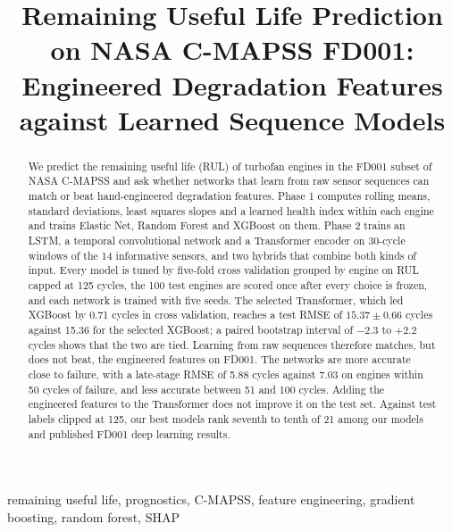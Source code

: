 \documentclass[conference]{IEEEtran}
\begin{document}
\title{Remaining Useful Life Prediction on NASA C-MAPSS FD001: Engineered Degradation Features against Learned Sequence Models}

\author{
}

\maketitle

\begin{abstract}
We predict the remaining useful life (RUL) of turbofan engines in the FD001
subset of NASA C-MAPSS and ask whether networks that learn from raw sensor
sequences can match or beat hand-engineered degradation features. Phase 1
computes rolling means, standard deviations, least squares slopes and a
learned health index within each engine and trains Elastic Net, Random
Forest and XGBoost on them. Phase 2 trains an LSTM, a temporal
convolutional network and a Transformer encoder on 30-cycle windows of the
14 informative sensors, and two hybrids that combine both kinds of input.
Every model is tuned by five-fold cross validation grouped by engine on RUL
capped at 125 cycles, the 100 test engines are scored once after every
choice is frozen, and each network is trained with five seeds. The selected
Transformer, which led XGBoost by 0.71 cycles in cross validation, reaches
a test RMSE of $15.37 \pm 0.66$ cycles against 15.36 for the selected
XGBoost; a paired bootstrap interval of $-2.3$ to $+2.2$ cycles shows that
the two are tied. Learning from raw sequences therefore matches, but does
not beat, the engineered features on FD001. The networks are more accurate
close to failure, with a late-stage RMSE of 5.88 cycles against 7.03 on
engines within 50 cycles of failure, and less accurate between 51 and 100
cycles. Adding the engineered features to the Transformer does not improve
it on the test set. Against test labels clipped at 125, our best models rank
seventh to tenth of 21 among our models and published FD001 deep learning
results.
\end{abstract}

\begin{IEEEkeywords}
remaining useful life, prognostics, C-MAPSS, feature engineering, gradient
boosting, random forest, SHAP
\end{IEEEkeywords}




















\end{document}
